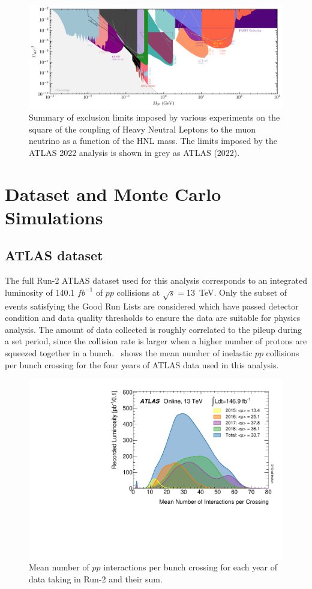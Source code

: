 \begin{figure}[!ht]
    \centering
    \includegraphics[width=0.8\linewidth]{figures/analysis_overview/HNL_summary_mu.png}
    \caption{Summary of exclusion limits imposed by various experiments on the square of the coupling of Heavy Neutral Leptons to the muon neutrino as a function of the HNL mass. The limits imposed by the ATLAS 2022 analysis is shown in grey as ATLAS (2022).~\cite{Fernandez-Martinez:2023phj}}
    \label{fig:HNL-summ-mu}
\end{figure}

\section{Dataset and Monte Carlo Simulations}\label{sec:data_mc_samples}
\subsection{ATLAS dataset}
The full Run-2 ATLAS dataset used for this analysis corresponds to an integrated luminosity of 140.1 $fb^{-1}$ of $pp$ collisions at $\sqrt{s}=$13~TeV. Only the subset of events satisfying the Good Run Lists are considered which have passed detector condition and data quality thresholds to ensure the data are suitable for physics analysis. The amount of data collected is roughly correlated to the pileup during a set period, since the collision rate is larger when a higher number of protons are squeezed together in a bunch.~ shows the mean number of inelastic $pp$ collisions per bunch crossing for the four years of ATLAS data used in this analysis.

\begin{figure}[!ht]
    \centering
    \includegraphics[width=0.8\linewidth]{figures/analysis_overview/mu_2015_2018.pdf}
    \caption{Mean number of $pp$ interactions per bunch crossing for each year of data taking in Run-2 and their sum.~\cite{atlas-lumi-pub}}
    \label{fig:pileup}
\end{figure}

